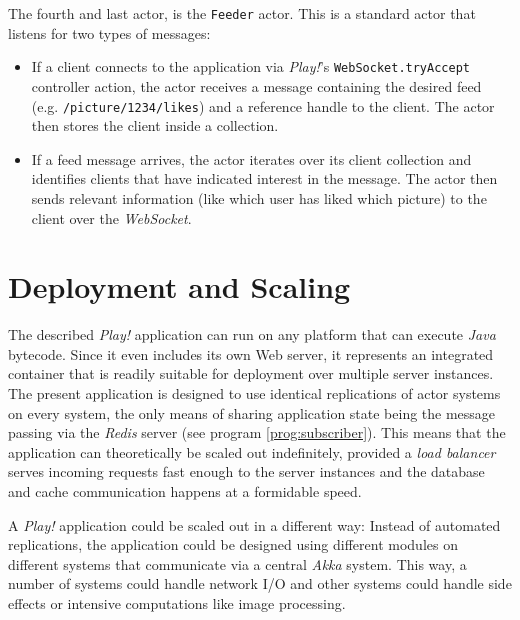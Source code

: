 The fourth and last actor, is the \texttt{Feeder} actor. This is a standard actor that listens for two types of messages:
\begin{itemize}
  \item{If a client connects to the application via \textit{Play!}'s \texttt{WebSocket.tryAccept} controller action, the actor receives a message containing the desired feed (e.g. \texttt{/picture/1234/likes}) and a reference handle to the client. The actor then stores the client inside a collection.}
  \item{If a feed message arrives, the actor iterates over its client collection and identifies clients that have indicated interest in the message. The actor then sends relevant information (like which user has liked which picture) to the client over the \textit{WebSocket}.}
\end{itemize}

\section{Deployment and Scaling}
The described \textit{Play!} application can run on any platform that can execute \textit{Java} bytecode. Since it even includes its own Web server, it represents an integrated container that is readily suitable for deployment over multiple server instances. The present application is designed to use identical replications of actor systems on every system, the only means of sharing application state being the message passing via the \textit{Redis} server (see program \ref{prog:subscriber}). This means that the application can theoretically be scaled out indefinitely, provided a \textit{load balancer} serves incoming requests fast enough to the server instances and the database and cache communication happens at a formidable speed.

A \textit{Play!} application could be scaled out in a different way: Instead of automated replications, the application could be designed using different modules on different systems that communicate via a central \textit{Akka} system. This way, a number of systems could handle network I/O and other systems could handle side effects or intensive computations like image processing.
